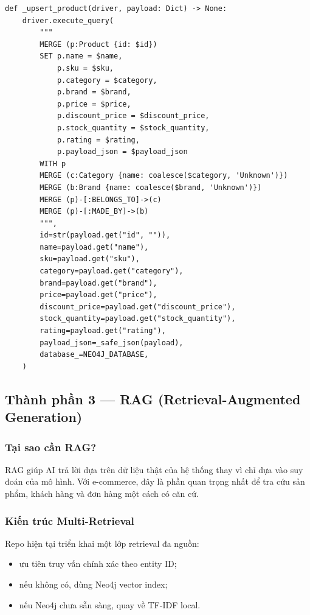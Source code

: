 \documentclass[12pt,a4paper]{article}
\begin{document}
\begin{lstlisting}[style=code,caption={Upsert dữ liệu sản phẩm, đơn hàng và tài liệu vào Neo4j}]
def _upsert_product(driver, payload: Dict) -> None:
    driver.execute_query(
        """
        MERGE (p:Product {id: $id})
        SET p.name = $name,
            p.sku = $sku,
            p.category = $category,
            p.brand = $brand,
            p.price = $price,
            p.discount_price = $discount_price,
            p.stock_quantity = $stock_quantity,
            p.rating = $rating,
            p.payload_json = $payload_json
        WITH p
        MERGE (c:Category {name: coalesce($category, 'Unknown')})
        MERGE (b:Brand {name: coalesce($brand, 'Unknown')})
        MERGE (p)-[:BELONGS_TO]->(c)
        MERGE (p)-[:MADE_BY]->(b)
        """,
        id=str(payload.get("id", "")),
        name=payload.get("name"),
        sku=payload.get("sku"),
        category=payload.get("category"),
        brand=payload.get("brand"),
        price=payload.get("price"),
        discount_price=payload.get("discount_price"),
        stock_quantity=payload.get("stock_quantity"),
        rating=payload.get("rating"),
        payload_json=_safe_json(payload),
        database_=NEO4J_DATABASE,
    )
\end{lstlisting}

\subsection{Thành phần 3 --- RAG (Retrieval-Augmented Generation)}
\subsubsection{Tại sao cần RAG?}
RAG giúp AI trả lời dựa trên dữ liệu thật của hệ thống thay vì chỉ dựa vào suy đoán của mô hình. Với e-commerce, đây là phần quan trọng nhất để tra cứu sản phẩm, khách hàng và đơn hàng một cách có căn cứ.

\subsubsection{Kiến trúc Multi-Retrieval}
Repo hiện tại triển khai một lớp retrieval đa nguồn:
\begin{itemize}
  \item ưu tiên truy vấn chính xác theo entity ID;
  \item nếu không có, dùng Neo4j vector index;
  \item nếu Neo4j chưa sẵn sàng, quay về TF-IDF local.
\end{itemize}
\end{document}
